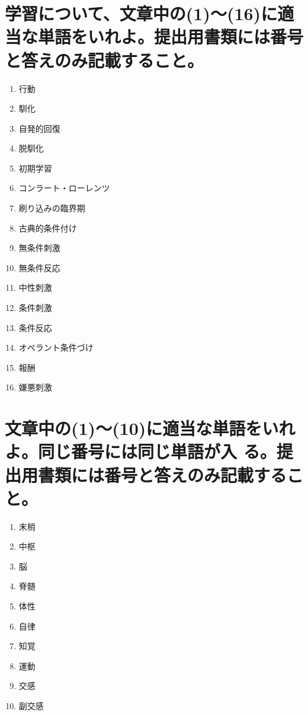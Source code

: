 \documentclass[titlepage,a4paper]{jsarticle}
\begin{document}
\section{学習について、文章中の(1)〜(16)に適当な単語をいれよ。提出用書類には番号と答えのみ記載すること。}%
\begin{enumerate}
      \item 行動
      \item 馴化
      \item 自発的回復
      \item 脱馴化
      \item 初期学習
      \item コンラート・ローレンツ
      \item 刷り込みの臨界期
      \item 古典的条件付け
      \item 無条件刺激
      \item 無条件反応
      \item 中性刺激
      \item 条件刺激
      \item 条件反応
      \item オペラント条件づけ
      \item 報酬
      \item 嫌悪刺激
\end{enumerate}
\section{文章中の(1)〜(10)に適当な単語をいれよ。同じ番号には同じ単語が入 る。提出用書類には番号と答えのみ記載すること。}%
\begin{enumerate}
      \item 末梢
      \item 中枢
      \item 脳
      \item 脊髄
      \item 体性
      \item 自律
      \item 知覚
      \item 運動
      \item 交感
      \item 副交感
\end{enumerate}
\end{document}

